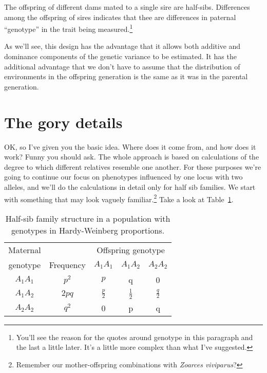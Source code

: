 \documentclass[12pt]{article}
\begin{document}
The offspring of different dams mated to a single sire are
half-sibs. Differences among the offspring of sires indicates that
thee are differences in paternal ``genotype'' in the trait being
measured.\footnote{You'll see the reason for the quotes around
  genotype in this paragraph and the last a little later. It's a
  little more complex than what I've suggested.}

As we'll see, this design has the advantage that it allows both
additive and dominance components of the genetic variance to be
estimated. It has the additional advantage that we don't have to
assume that the distribution of environments in the offspring
generation is the same as it was in the parental generation.

\section*{The gory details}

OK, so I've given you the basic idea. Where does it come from, and how
does it work? Funny you should ask. The whole approach is based on
calculations of the degree to which different relatives resemble one
another. For these purposes we're going to continue our focus on
phenotypes influenced by one locus with two alleles, and we'll do the
calculations in detail only for half sib families. We start with
something that may look vaguely familiar.\footnote{Remember our
  mother-offspring combinations with {\it Zoarces viviparus\/}?} Take
a look at Table~\ref{table:half-sib}.

\begin{table}
\begin{center}
\begin{tabular}{c|c|ccc}
\hline\hline
Maternal &           & \multicolumn{3}{c}{Offspring genotype} \\
genotype & Frequency & $A_1A_1$      & $A_1A_2$      & $A_2A_2$ \\
\hline
$A_1A_1$ & $p^2$     & $p$           & q             & 0 \\
$A_1A_2$ & $2pq$     & $\frac{p}{2}$ & $\frac{1}{2}$ & $\frac{q}{2}$ \\
$A_2A_2$ & $q^2$     & 0             & p             & q \\
\hline
\end{tabular}
\end{center}
\caption{Half-sib family structure in a population with genotypes in
  Hardy-Weinberg proportions.}\label{table:half-sib}
\end{table}
\end{document}
